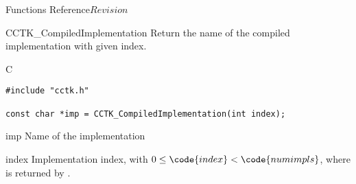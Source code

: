 \begin{cactuspart}{ Functions Reference}{}{$Revision$}
\begin{FunctionDescription}{CCTK\_CompiledImplementation}
\label{CCTK-CompiledImplementation}
Return the name of the compiled implementation with given index.

\begin{SynopsisSection}
\begin{Synopsis}{C}
\begin{verbatim}
#include "cctk.h"

const char *imp = CCTK_CompiledImplementation(int index);
\end{verbatim}
\end{Synopsis}
\end{SynopsisSection}

\begin{ResultSection}
\begin{Result}{imp}
Name of the implementation
\end{Result}
\end{ResultSection}

\begin{ParameterSection}
\begin{Parameter}{index}
Implementation index, with $0 \le \code{index} < \code{numimpls}$,
where  is returned by
.
\end{Parameter}
\end{ParameterSection}


\end{FunctionDescription}
\end{cactuspart}

